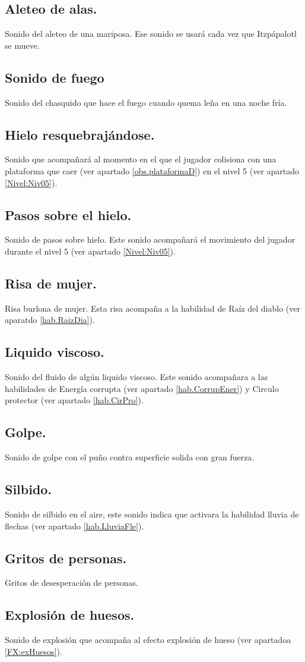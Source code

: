 \subsection{Aleteo de alas.} \label{SFX:Aleteo}
Sonido del aleteo de una mariposa. Ese sonido se usará cada vez que Itzpápalotl se mueve.
\subsection{Sonido de fuego} \label{SFX:Fuego}
Sonido del chasquido que hace el fuego cuando quema leña en una noche fría. 
\subsection{Hielo resquebrajándose.} \label{SFX:HieloRes}
Sonido que acompañará al momento en el que el jugador colisiona con una plataforma que caer (ver apartado \ref{obs.plataformaD}) en el nivel 5 (ver apartado \ref{Nivel:Niv05}).
\subsection{Pasos sobre el hielo.} \label{SFX:PasHiel}
Sonido de pasos sobre hielo. Este sonido acompañará el movimiento del jugador durante el nivel 5 (ver apartado \ref{Nivel:Niv05}).
\subsection{Risa de mujer.}\label{SFX:risaM}
Risa burlona de mujer. Esta risa acompaña a la habilidad de Raíz del diablo (ver aparatdo \ref{hab.RaizDia}).

\subsection{Liquido viscoso.}\label{SFX:ligVisc}
Sonido del fluido de algún liquido viscoso. Este sonido acompañara a las habilidades de Energía corrupta (ver apartado \ref{hab.CorrupEner}) y Circulo protector (ver apartado \ref{hab.CirPro}).
\subsection{Golpe.} \label{SFX:golpe}
Sonido de golpe con el puño contra superficie solida con gran fuerza.
\subsection{Silbido.} \label{SFX:silbido}
Sonido de silbido en el aire, este sonido indica que activara la habilidad lluvia de flechas (ver apartado \ref{hab.LluviaFle}).
\subsection{Gritos de personas.} \label{SFX:griPersonas}
Gritos de desesperación de personas.
\subsection{Explosión de huesos.} \label{SFX:exHuesos}
Sonido de explosión que acompaña al efecto explosión de hueso (ver apartadoa \ref{FX:exHuesos}).